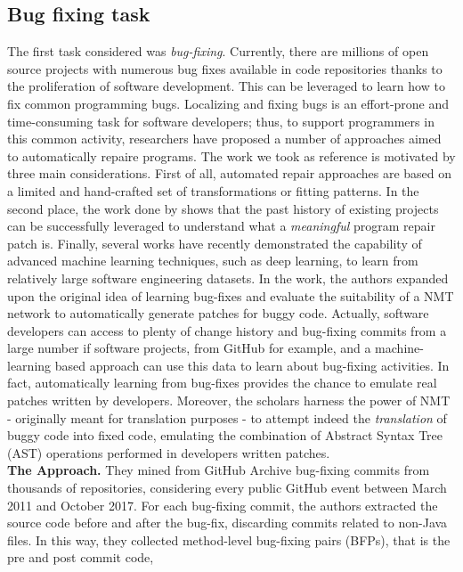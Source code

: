 \subsection{Bug fixing task}
The first task considered was \textit{bug-fixing}.
Currently, there are millions of open source projects with numerous bug fixes available in code repositories
thanks to the proliferation of software development. This can be leveraged to learn how to fix common programming bugs. 
Localizing and fixing bugs is an effort-prone and time-consuming task for software developers;
thus, to support programmers in this common activity, researchers have proposed a number of approaches aimed to automatically repaire programs.
The work we took as reference is motivated by three main considerations. 
First of all, automated repair approaches are based on a limited and hand-crafted
set of transformations or fitting patterns. 
In the second place, the work done by \cite{le2016history} shows that the past history of 
existing projects can be successfully leveraged to understand what a \textit{meaningful} program repair patch is. 
Finally, several works have recently demonstrated the capability of advanced machine learning techniques, such as deep learning, to learn from relatively large software engineering
datasets. 
In the work, the authors expanded upon the original idea of learning bug-fixes and evaluate the suitability of a NMT network to automatically
generate patches for buggy code.
Actually, software developers can access to plenty of change history and 
bug-fixing commits from a large number if software projects, from GitHub for example, and
a machine-learning based approach can use this data to learn about 
bug-fixing activities. In fact, automatically learning from bug-fixes provides the 
chance to emulate real patches written by developers. 
Moreover, the scholars harness the power of NMT - originally meant for translation purposes -
to attempt indeed the \textit{translation} of buggy code into fixed code, emulating 
the combination of Abstract Syntax Tree (AST) operations performed in developers written patches.\\
\newline
\textbf{The Approach.} They mined from GitHub Archive \cite{grigorik2012github} bug-fixing commits 
from thousands of repositories, considering every public GitHub event between March 2011 and 
October 2017. For each bug-fixing commit, the authors extracted the source code before and 
after the bug-fix, discarding commits related to non-Java files. In this way, they 
collected method-level bug-fixing pairs (BFPs), that is the pre and post commit code, 
